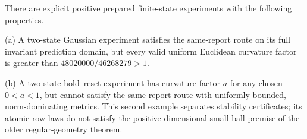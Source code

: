 \begin{proposition}\label{prop:separation}
There are explicit positive prepared finite-state experiments with the following properties.

\textup{(a)} A two-state Gaussian experiment satisfies the same-report route on its full invariant prediction domain, but every valid uniform Euclidean curvature factor is greater than $48020000/46268279>1$.

\textup{(b)} A two-state hold--reset experiment has curvature factor $a$ for any chosen $0<a<1$, but cannot satisfy the same-report route with uniformly bounded, norm-dominating metrics. This second example separates stability certificates; its atomic row laws do not satisfy the positive-dimensional small-ball premise of the older regular-geometry theorem.
\end{proposition}
